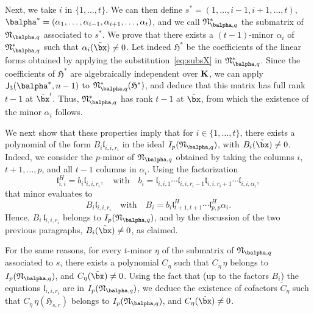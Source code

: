 \documentclass[12pt]{article}
\begin{document}
Next, we take $i$ in $\{1,\dots,t\}$. We can then define
$s^*=(1,\dots,i-1,i+1,\dots,t)$,
$\balpha^*=(\alpha_1,\dots,\alpha_{i-1},\alpha_{i+1},\dots,\alpha_t)$, and we call
$\mathfrak{N}_{\balpha,q}^*$ the submatrix of
$\mathfrak{N}_{\balpha,q}$ associated to $s^*$. We prove that there exists a $(t-1)$-minor
$\alpha_i$ of $\mathfrak{N}_{\balpha,q}^*$ such that $\alpha_i(\tilde\bx)\ne 0$.  Let indeed
$\mathfrak{H}^*$ be the coefficients of the linear forms obtained by
applying the substitution~\eqref{eq:subsX} in
$\mathfrak{N}_{\balpha,q}^*$. Since the coefficients of $\mathfrak{H}^*$
are algebraically independent over $\mathbf{K}$, we can apply $\assI_3(\balpha^*,n-1)$ to $\mathfrak{N}_{\balpha,q}^*(\mathfrak{H}^*)$,
and deduce that this matrix has full rank $t-1$ at $\tilde\bx'$.
Thus, $\mathfrak{N}_{\balpha,q}^*$ has rank $t-1$ at $\tilde\bx$, 
from which the existence of the minor $\alpha_i$ follows.

We next show that these properties imply that for $i\in\{1,\dots,t\}$,
there exists a polynomial of the form $B_{i} \mathfrak{l}_{i,i,r_i}$
in the ideal $I_p(\mathfrak{N}_{\balpha,q})$, with $B_{i}(\tilde\bx)\ne
0$. Indeed, we consider the $p$-minor of $\mathfrak{N}_{\balpha,q}$
obtained by taking the columns $i$,$t+1,\dots,p$, and all $t-1$ columns
in $\alpha_i$. Using the factorization
$$\mathfrak{l}^H_{i,i} = b_i \mathfrak{l}_{i,i,r_i},\quad\text{with}\quad
b_i=\mathfrak{l}_{i,i,1}\cdots \mathfrak{l}_{i,i,r_i-1}\mathfrak{l}_{i,i,r_i+1}\cdots \mathfrak{l}_{i,i,\alpha_i},$$
that minor evaluates to 
$$B_i \mathfrak{l}_{i,i,r_i}\quad\text{with}\quad B_i = b_i
\mathfrak{l}^H_{t+1,t+1}\cdots \mathfrak{l}^H_{p,p}\alpha_i.$$ Hence, $B_i\,
\mathfrak{l}_{i,i,r_i}$ belongs to $I_p(\mathfrak{N}_{\balpha,q})$, and by
the discussion of the two previous paragraphs, $B_i(\tilde\bx)\ne 0$,
as claimed.

For the same reasons, for every $t$-minor $\eta$ of the submatrix of
$\mathfrak{N}_{\balpha,q}$ associated to $s$, there exists a polynomial
$C_\eta$ such that $C_\eta\, \eta$ belongs to
$I_p(\mathfrak{N}_{\balpha,q})$, and $C_\eta(\tilde\bx)\ne 0$. 
Using the
fact that (up to the factors $B_i$) the equations
$\mathfrak{l}_{i,i,r_i}$ are in $I_p(\mathfrak{N}_{\balpha,q})$, we deduce
the existence of cofactors $\tilde C_\eta$ such that $C_\eta\, \eta(\mathfrak{H}_{s,r})$
belongs to $I_p(\mathfrak{N}_{\balpha,q})$, and $C_\eta(\tilde\bx)\ne 0$.
\end{document}
